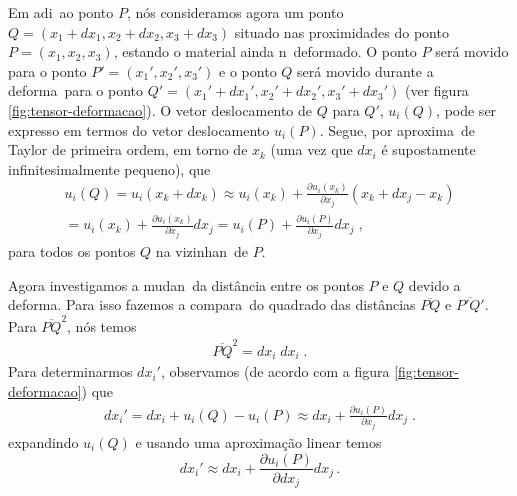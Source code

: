Em adi\cao\ ao ponto $P$, n\'os consideramos agora um ponto
$Q=(x_1+dx_1,x_2+dx_2,x_3+dx_3)$ situado nas proximidades do
ponto $P=(x_1,x_2,x_3)$, estando o material ainda n\ao\ deformado. O
ponto $P$ ser\'a movido para o ponto $P'=(x_1',x_2',x_3')$ e o ponto
$Q$ ser\'a movido durante a deforma\cao\ para o ponto
$Q'=(x_1'+dx_1',x_2'+dx_2',x_3'+dx_3')$ (ver figura \ref{fig:tensor-deformacao}). O vetor
deslocamento de $Q$ para $Q'$, $u_i(Q)$, pode ser expresso em termos do
vetor deslocamento $u_i(P)$. Segue, por aproxima\cao\ de Taylor de
primeira ordem, em torno de $x_k$ (uma vez que $dx_i$ \'e supostamente infinitesimalmente
pequeno), que
\begin{eqnarray} \label{vdq}
u_i(Q) = u_i(x_k+dx_k) \approx u_i(x_k) +
\frac{\partial u_i(x_k)}
{\partial x_j} (x_k + dx_j - x_k) \nonumber \\
 = u_i(x_k) +\frac{\partial u_i(x_k)}
{\partial x_j} dx_j = u_i(P) + \frac{\partial u_i(P)}
{\partial x_j} dx_j \; ,
\end{eqnarray}
para todos os pontos $Q$ na vizinhan\ca\ de $P$.


Agora investigamos a mudan\ca\ da dist\^ancia entre os pontos
$P$ e $Q$ devido a deforma\cao. Para isso fazemos a
compara\cao\ do quadrado das dist\^ancias $\overline{PQ}$
e $\overline{P'Q'}$.
Para $\overline{PQ}^2$, n\'os temos
\begin{eqnarray}
\overline{PQ}^2 = dx_i \; dx_i \; .
\end{eqnarray}
Para determinarmos $dx_i'$, observamos (de acordo com a figura \ref{fig:tensor-deformacao}) que
\begin{eqnarray}
dx_i' = dx_i + u_i(Q) - u_i(P) \approx dx_i +
\frac{\partial u_i(P)}{\partial x_j} dx_j \; .
\label{dxidxi}
\end{eqnarray}
expandindo $u_i(Q)$ e usando uma aproxima\c{c}\~ao linear temos
\begin{equation}
  dx_i' \approx dx_i + \frac{\partial u_i(P)}{\partial dx_j}dx_j \, .
\end{equation}


